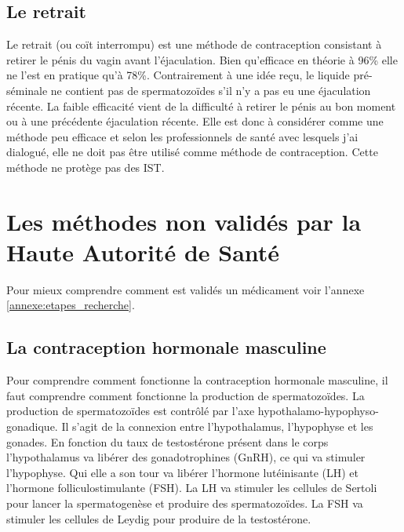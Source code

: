 \documentclass[12pt,a4paper]{report}
\begin{document}
\subsection{Le retrait} \label{section:leretrait}

Le retrait (ou coït interrompu) est une méthode de contraception consistant à retirer le pénis du vagin avant l'éjaculation. \cite{CoitInterrompuWikipedia}
Bien qu'efficace en théorie à 96\% elle ne l'est en pratique qu'à 78\%. \cite{TousMoyensContraception2023}
Contrairement à une idée reçu, le liquide pré-séminale ne contient pas de spermatozoïdes s'il n'y a pas eu une éjaculation récente. \cite{freeMaleContraceptionPrescription}
La faible efficacité vient de la difficulté à retirer le pénis au bon moment ou à une précédente éjaculation récente. \cite{CoitInterrompuWikipedia}
Elle est donc à considérer comme une méthode peu efficace et selon les professionnels de santé avec lesquels j'ai dialogué, elle ne doit pas être utilisé comme méthode de contraception.
Cette méthode ne protège pas des IST.

\section{Les méthodes non validés par la Haute Autorité de Santé}

Pour mieux comprendre comment est validés un médicament voir l'annexe \ref{annexe:etapes_recherche}.

\subsection{La contraception hormonale masculine}

Pour comprendre comment fonctionne la contraception hormonale masculine, il faut comprendre comment fonctionne la production de spermatozoïdes.
La production de spermatozoïdes est contrôlé par l'axe hypothalamo-hypophyso-gonadique. Il s'agit de la connexion entre l’hypothalamus, l’hypophyse et les gonades. \cite{HypothalamicPituitaryGonadal2022}
En fonction du taux de testostérone présent dans le corps l'hypothalamus va libérer des gonadotrophines (GnRH), ce qui va stimuler l'hypophyse. Qui elle a son tour va libérer l'hormone lutéinisante (LH) et l'hormone folliculostimulante (FSH).
La LH va stimuler les cellules de Sertoli pour lancer la spermatogenèse et produire des spermatozoïdes. La FSH va stimuler les cellules de Leydig pour produire de la testostérone. \cite{abbeMaleContraception2020}
\end{document}
